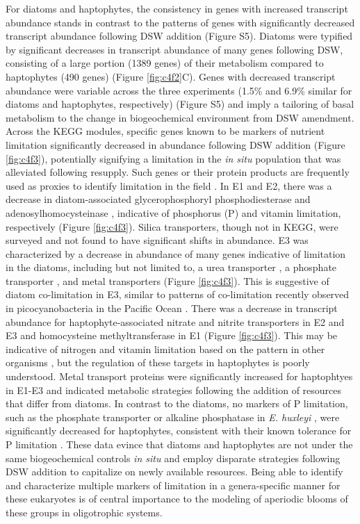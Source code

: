 For diatoms and haptophytes, the consistency in genes with increased transcript abundance stands in contrast to the patterns of genes with significantly decreased transcript abundance following DSW addition (Figure S5). Diatoms were typified by significant decreases in transcript abundance of many genes following DSW, consisting of a large portion (1389 genes) of their metabolism compared to haptophytes (490 genes) (Figure \ref{fig:c4f2}C). Genes with decreased transcript abundance were variable across the three experiments (1.5\% and 6.9\% similar for diatoms and haptophytes, respectively) (Figure S5) and imply a tailoring of basal metabolism to the change in biogeochemical environment from DSW amendment. Across the KEGG modules, specific genes known to be markers of nutrient limitation significantly decreased in abundance following DSW addition (Figure \ref{fig:c4f3}), potentially signifying a limitation in the \textit{in situ} population that was alleviated following resupply. Such genes or their protein products are frequently used as proxies to identify limitation in the field \citep{Saito2014}. In E1 and E2, there was a decrease in diatom-associated glycerophosphoryl phosphodiesterase \citep{Dyhrman2012} and adenosylhomocysteinase \citep{Bertrand2012a}, indicative of phosphorus (P) and vitamin limitation, respectively (Figure \ref{fig:c4f3}). Silica transporters, though not in KEGG, were surveyed and not found to have significant shifts in abundance. E3 was characterized by a decrease in abundance of many genes indicative of limitation in the diatoms, including but not limited to, a urea transporter \citep{Bender2012}, a phosphate transporter \citep{Dyhrman2012}, and metal transporters (Figure \ref{fig:c4f3}). This is suggestive of diatom co-limitation in E3, similar to patterns of co-limitation recently observed in picocyanobacteria in the Pacific Ocean \citep{Saito2014}. There was a decrease in transcript abundance for haptophyte-associated nitrate and nitrite transporters in E2 and E3 and homocysteine methyltransferase in E1 (Figure \ref{fig:c4f3}). This may be indicative of nitrogen and vitamin limitation based on the pattern in other organisms \citep{Bertrand2012a, Bender2014}, but the regulation of these targets in haptophytes is poorly understood. Metal transport proteins were significantly increased for haptophtyes in E1-E3 and indicated metabolic strategies following the addition of resources that differ from diatoms. In contrast to the diatoms, no markers of P limitation, such as the phosphate transporter or alkaline phosphatase in \textit{E. huxleyi} \citep{Dyhrman2006, Dyhrman2003, Xu2006}, were significantly decreased for haptophytes, consistent with their known tolerance for P limitation \citep{Lessard2005}. These data evince that diatoms and haptophytes are not under the same biogeochemical controls \textit{in situ} and employ disparate strategies following DSW addition to capitalize on newly available resources. Being able to identify and characterize multiple markers of limitation in a genera-specific manner for these eukaryotes is of central importance to the modeling of aperiodic blooms of these groups in oligotrophic systems. \par 

